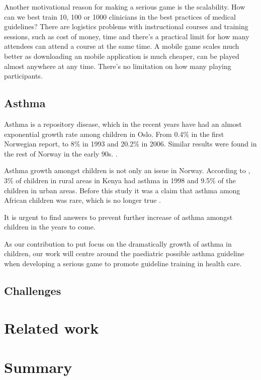 Another motivational reason for making a serious game is the scalability. How can we best train 10, 100 or 1000 clinicians in the best practices of medical guidelines? There are logistics problems with instructional courses and training sessions, such as cost of money, time and there's a practical limit for how many attendees can attend a course at the same time. A mobile game scales much better as downloading an mobile application is much cheaper, can be played almost anywhere at any time. There's no limitation on how many playing participants.

\subsection{Asthma}
Asthma is a repository disease, which in the recent years have had an almost exponential growth rate among children in Oslo. From 0.4\% in the first Norwegian report, to 8\% in 1993 and 20.2\% in 2006. Similar results were found in the rest of Norway in the early 90s. \parencite{Carlsen2006}. 

Asthma growth amongst children is not only an issue in Norway. According to \textcite{Odhiambo1998}, 3\% of children in rural areas in Kenya had asthma in 1998 and 9.5\% of the children in urban areas. Before this study it was a claim that asthma among African children was rare, which is no longer true \parencite{Odhiambo1998}.

It is urgent to find answers to prevent further increase of asthma amongst children in the years to come\parencite{Carlsen2006}.

As our contribution to put focus on the dramatically growth of asthma in children, our work will centre around the paediatric possible asthma guideline \parencite{RepublicofKeny2016} when developing a serious game to promote guideline training in health care.

\subsection{Challenges}
\section{Related work}
\section{Summary}